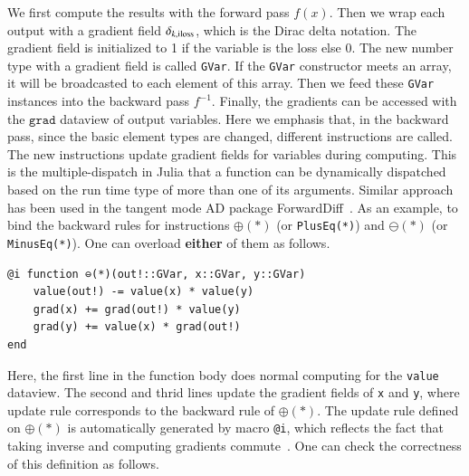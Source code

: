 \documentclass{article}
\newcommand{\<}{\langle}
\renewcommand{\>}{\rangle}
\newcommand{\grad}{{\texttt{grad}}}
\theoremstyle{definition}\newtheorem{definition}{\textit{Definition}}
\begin{document}
We first compute the results with the forward pass $f(x)$.
Then we wrap each output with a gradient field $\delta_{k, \rm iloss}$, which is the Dirac delta notation. The gradient field is initialized to 1 if the variable is the loss else 0. The new number type with a gradient field is called \texttt{GVar}. If the \texttt{GVar} constructor meets an array, it will be broadcasted to each element of this array. Then we feed these \texttt{GVar} instances into the backward pass $f^{-1}$.
Finally, the gradients can be accessed with the $\grad$ dataview of output variables.
Here we emphasis that, in the backward pass, since the basic element types are changed, different instructions are called.
The new instructions update gradient fields for variables during computing.
This is the multiple-dispatch in Julia that a function can be dynamically dispatched based on the run time type of more than one of its arguments.
Similar approach has been used in the tangent mode AD package ForwardDiff~\cite{Revels2016}.
As an example, to bind the backward rules for instructions \texttt{$\oplus(*)$} (or \texttt{PlusEq(*)}) and \texttt{$\ominus(*)$} (or \texttt{MinusEq(*)}). One can overload \textbf{either} of them as follows.

\begin{minipage}{.88\columnwidth}
    \begin{lstlisting}[mathescape=true]
@i function ⊖(*)(out!::GVar, x::GVar, y::GVar)
    value(out!) -= value(x) * value(y)
    grad(x) += grad(out!) * value(y)
    grad(y) += value(x) * grad(out!)
end
\end{lstlisting}
\end{minipage}

Here, the first line in the function body does normal computing for the \texttt{value} dataview. The second and thrid lines update the gradient fields of \texttt{x} and \texttt{y}, where update rule corresponds to the backward rule of $\oplus(*)$.
The update rule defined on $\oplus(*)$ is automatically generated by macro \texttt{@i}, which reflects the fact that taking inverse and computing gradients commute~\cite{Mcinerney2015}.
One can check the correctness of this definition as follows.
\end{document}
